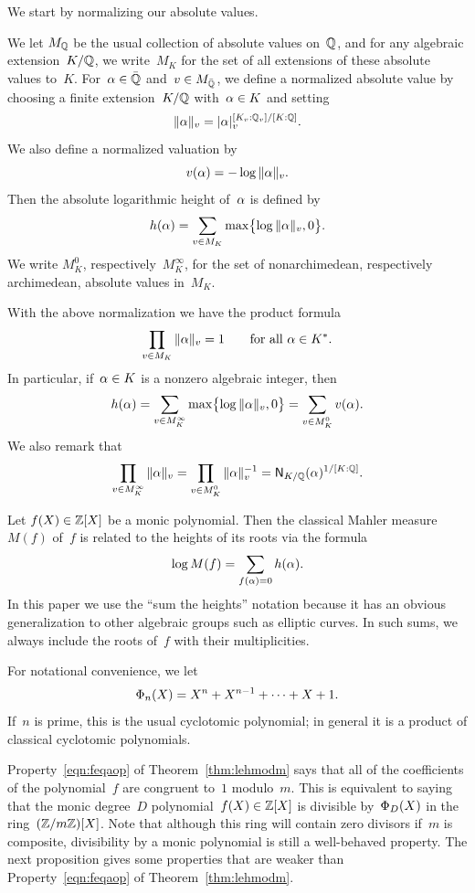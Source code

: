 \documentclass[12pt,reqno]{amsart}
\begin{document}
We start by normalizing our absolute values.

\begin{definition}
We let $M_{\mathbb{Q}}$ be the usual collection of absolute values on~$\mathbb{Q}$,
and for any algebraic extension~$K/\mathbb{Q}$, we write~$M_K$ for the set of
all extensions of these absolute values to~$K$.  For~$\alpha\in{\bar{\mathbb{Q}}}$
and~$v\in M_{\bar{\mathbb{Q}}}$, we define a normalized absolute value by choosing
a finite extension~$K/\mathbb{Q}$ with~$\alpha\in K$ and setting
\[
  \|\alpha\|_v = |\alpha|_v^{[K_v:\mathbb{Q}_v]/[K:\mathbb{Q}]}.
\]
We also define a normalized valuation by
\[
  v(\alpha) = -\log\|\alpha\|_v.
\]
Then the absolute logarithmic height of~$\alpha$ is defined by
\[
  h(\alpha) = \sum_{v\in M_K} \max\bigl\{\log\|\alpha\|_v,0\bigr\}.
\]
We write $M_K^0$, respectively~$M_K^\infty$, for the set of
nonarchimedean, respectively archimedean, absolute values in~$M_K$.
\end{definition}

\begin{remark}
With the above normalization we have the product formula
\[
  \prod_{v\in M_K} \|\alpha\|_v = 1\qquad\text{for all $\alpha\in K^*$.}
\]
In particular, if~$\alpha\in K$ is a nonzero algebraic integer, then
\[
  h(\alpha) = \sum_{v\in M_K^\infty}\max\bigl\{\log\|\alpha\|_v,0\bigr\}
    = \sum_{v\in M_K^0} v(\alpha).
\]
We also remark that
\[
  \prod_{v\in M_K^\infty} \|\alpha\|_v
  = \prod_{v\in M_K^0} \|\alpha\|_v^{-1} = {\operatorname{\mathsf{N}}}_{K/\mathbb{Q}}(\alpha)^{1/[K:\mathbb{Q}]}.
\]
\end{remark}

\begin{remark}
Let $f(X)\in\mathbb{Z}[X]$ be a monic polynomial. Then the classical Mahler
measure~$M(f)$ of~$f$ is related to the heights of its roots via the
formula
\[
  \log M(f) = \sum_{f(\alpha)=0} h(\alpha).
\]
In this paper we use the ``sum the heights'' notation because it has
an obvious generalization to other algebraic groups such as elliptic
curves. In such sums, we always include the roots of~$f$ with their
multiplicities.
\end{remark}

\begin{definition}
For notational convenience, we let
\[
  \Phi_n(X) = X^n+X^{n-1}+\cdots+X+1.
\]
If~$n$ is prime, this is the usual cyclotomic polynomial; in general it
is a product of classical cyclotomic polynomials.
\end{definition}

Property~\eqref{eqn:feqaop} of Theorem~\ref{thm:lehmodm} says that all
of the coefficients of the polynomial~$f$ are congruent to~$1$
modulo~$m$.  This is equivalent to saying that the monic degree~$D$
polynomial~$f(X)\in\mathbb{Z}[X]$ is divisible by~$\Phi_D(X)$ in the
ring~$(\mathbb{Z}/m\mathbb{Z})[X]$. Note that although this ring will contain zero
divisors if~$m$ is composite, divisibility by a monic polynomial is
still a well-behaved property.  The next proposition gives some
properties that are weaker than Property~\eqref{eqn:feqaop} of
Theorem~\ref{thm:lehmodm}.
\end{document}
